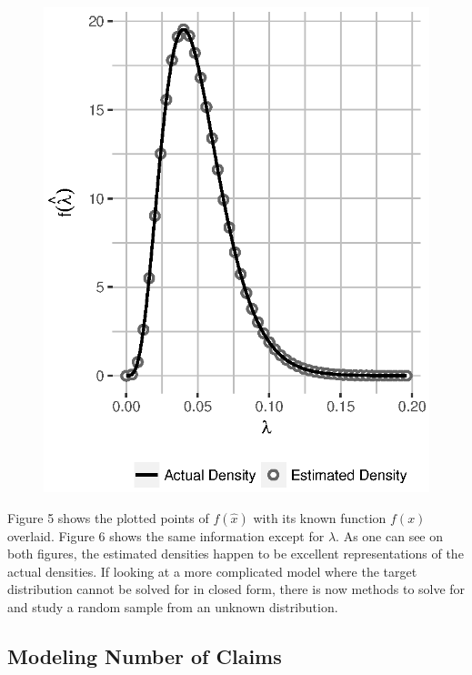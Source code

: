 \documentclass[11pt, oneside]{article}
\begin{document}
\begin{figure}[h]
\begin{minipage}{0.45\textwidth}
        \centering\includegraphics[scale=0.35]{Figure6}
     \end{minipage}
\end{figure}

Figure 5 shows the plotted points of $f(\hat{x})$ with its known function $f(x)$ overlaid. Figure 6 shows the same information except for $\lambda$. As one can see on both figures, the estimated densities happen to be excellent representations of the actual densities. If looking at a more complicated model where the target distribution cannot be solved for in closed form, there is now methods to solve for and study a random sample from an unknown distribution.

\subsection{Modeling Number of Claims}

\newcommand*{\permutationcombination}[4][0mu]{{{}_{#3}\mkern#1#2_{#4}}}
\newcommand*{\combination}[1][-1mu]{\permutationcombination[#1]{C}}
\end{document}
